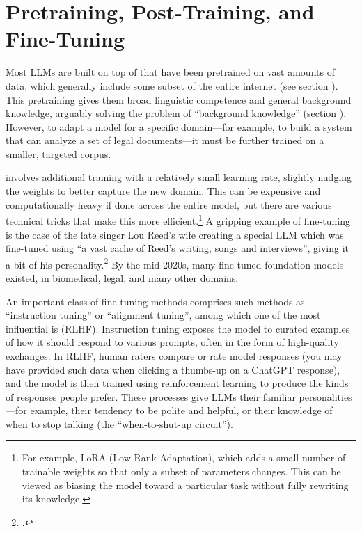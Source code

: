 \section{Pretraining, Post-Training, and Fine-Tuning}

Most LLMs are built on top of  that have been
pretrained on vast amounts of data, which generally include some subset of the entire internet (see
section ). This pretraining gives them broad linguistic
competence and general background knowledge, arguably solving the problem of
``background knowledge'' (section ). However, to adapt a
model for a specific domain---for example, to build a system that can analyze a
set of legal documents---it must be further trained on a smaller, targeted corpus.

 involves additional training with a relatively small
learning rate, slightly nudging the weights to better capture the new domain.
This can be expensive and computationally heavy if done across the entire
model, but there are various technical tricks that make this more
efficient.\footnote{For example, LoRA (Low-Rank Adaptation), which adds a small
number of trainable weights so that only a subset of parameters changes. This
can be viewed as biasing the model toward a particular task without fully
rewriting its knowledge.} A gripping example of
fine-tuning is the case of the late singer Lou Reed's wife creating a special
LLM which was fine-tuned using ``a vast cache of Reed's writing, songs and
interviews'', giving it a bit of his
personality.\footnote{.}  By the mid-2020s, many fine-tuned
foundation models existed, in biomedical, legal, and many other domains.

An important class of fine-tuning methods comprises such methods as 
``instruction tuning'' or ``alignment tuning'',  among which one of the most
influential is  (RLHF).
Instruction tuning exposes the model to curated examples of how it should
respond to various prompts, often in the form of high-quality exchanges. In RLHF,
human raters compare or rate model responses (you may have provided such data when 
clicking a thumbs-up on a ChatGPT response), and the model is then trained using
reinforcement learning to produce the kinds of responses people prefer.  These processes give LLMs
their familiar personalities---for example, their tendency to be polite and helpful, 
or their knowledge of when to stop talking (the ``when-to-shut-up
circuit''). 

